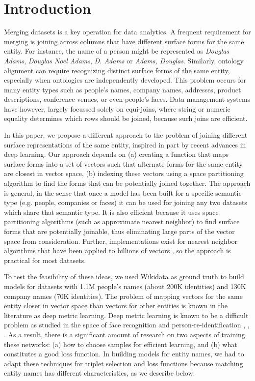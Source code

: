 \section{Introduction}

Merging datasets is a key operation for data analytics.  A frequent
requirement for merging is joining across columns that have
different surface forms for the same entity.  For instance, the name of a person might be represented as \textit{Douglas Adams}, \textit{Douglas Noel Adams}, \textit{D. Adams} or \textit{Adams, Douglas}.  Similarly, ontology alignment can require recognizing distinct surface forms of
the same entity, especially when ontologies are independently
developed.  This problem occurs for many entity types such as people's names, company names, addresses, product descriptions, conference venues, or even people's faces.  Data management systems have however, largely focussed solely on equi-joins, where string or numeric equality determines which rows should be joined, because such joins are efficient.

In this paper, we propose a different approach to the problem of joining different surface representations of the same entity, inspired in part by recent advances in deep learning.  Our approach depends on (a) creating a function that maps surface forms into a set of vectors such that alternate forms for the same entity are closest in vector space, (b) indexing these vectors using a space partitioning algorithm to find the forms that can be potentially joined together.  The approach is general, in the sense that once a model has been built for a specific semantic type (e.g. people, companies or faces) it can be used for joining any two datasets which share that semantic type.  It is also efficient because it uses space partitioning algorithms (such as approximate nearest neighbor) to find surface forms that are potentially joinable, thus eliminating large parts of the vector space from consideration.  Further, implementations exist for nearest neighbor algorithms that have been applied to billions of vectors \cite{JDH17}, so the approach is practical for most datasets.  

To test the feasibility of these ideas, we used Wikidata as ground truth to build models for datasets with 1.1M people's names (about 200K identities) and 130K company names (70K identities).  The problem of mapping vectors for the same entity closer in vector space than vectors for other entities is known in the literature as deep metric learning.  Deep metric learning is known to be a difficult problem as studied in the space of face recognition and person-re-identification \cite{DBLP:conf/cvpr/SchroffKP15}, \cite{8445716}, \cite{DBLP:journals/corr/abs-1802-03170}.  As a result, there is a significant amount of research on two aspects of training these networks: (a) how to choose samples for efficient learning, and (b) what constitutes a good loss function.  In building models for entity names, we had to adapt these techniques for triplet selection and loss functions because matching entity names has different characteristics, as we describe below.

